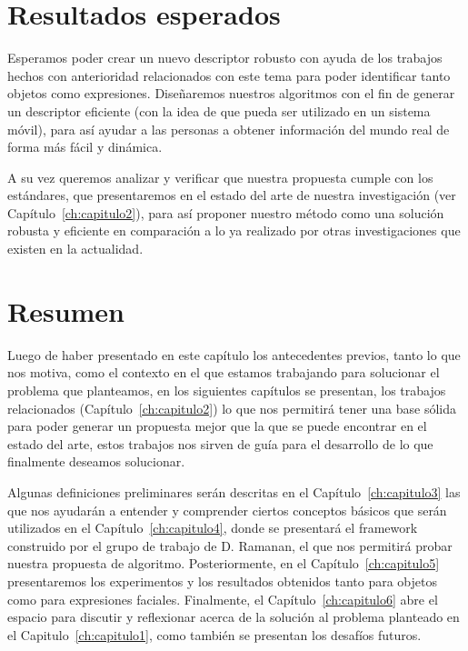 \section{Resultados esperados}
Esperamos poder crear un nuevo descriptor robusto con ayuda de los trabajos hechos con anterioridad relacionados con este tema para poder identificar tanto objetos como expresiones. Diseñaremos nuestros algoritmos con el fin de generar un descriptor eficiente (con la idea de que pueda ser utilizado en un sistema móvil), para así ayudar a las personas a obtener información del mundo real de forma más fácil y dinámica.

A su vez queremos analizar y verificar que nuestra propuesta cumple con los estándares, que presentaremos en el estado del arte de nuestra investigación (ver Capítulo~\ref{ch:capitulo2}), para así proponer nuestro método como una solución robusta y eficiente en comparación a lo ya realizado por otras investigaciones que existen en la actualidad.

\section{Resumen}

Luego de haber presentado en este capítulo los antecedentes previos, tanto lo que nos motiva, como el contexto en el que estamos trabajando para solucionar el problema que planteamos, en los siguientes capítulos se presentan, los trabajos relacionados (Capítulo~\ref{ch:capitulo2}) lo que nos permitirá tener una base sólida para poder generar un propuesta mejor que la que se puede encontrar en el estado del arte, estos trabajos nos sirven de guía para el desarrollo de lo que finalmente deseamos solucionar. 

Algunas definiciones preliminares serán descritas en el Capítulo~\ref{ch:capitulo3} las que nos ayudarán a entender y comprender ciertos conceptos básicos que serán utilizados en el Capítulo~\ref{ch:capitulo4}, donde se presentará el framework construido por el grupo de trabajo de D. Ramanan, el que nos permitirá probar nuestra propuesta de algoritmo. Posteriormente, en el Capítulo~\ref{ch:capitulo5} presentaremos los experimentos y los resultados obtenidos tanto para objetos como para expresiones faciales. Finalmente, el Capítulo~\ref{ch:capitulo6} abre el espacio para discutir y reflexionar acerca de la solución al problema planteado en el Capitulo~\ref{ch:capitulo1}, como también se presentan los desafíos futuros.